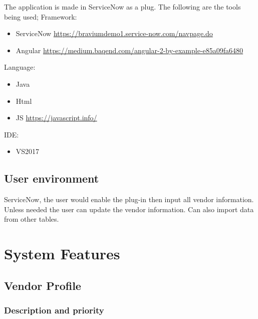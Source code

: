 \documentclass[10pt]{article}
\begin{document}
The application is made in ServiceNow as a plug. The following are the tools being used;
Framework:
\begin{itemize}
	\item ServiceNow \url{https://braviumdemo1.service-now.com/navpage.do}
	\item Angular \url{https://medium.baqend.com/angular-2-by-example-e85a09fa6480}
\end{itemize}
Language:
\begin{itemize}
	\item Java
	\item Html
	\item JS \url{https://javascript.info/}
\end{itemize}
IDE:
\begin{itemize}
	\item VS2017
\end{itemize}

\subsection{User environment}

ServiceNow, the user would enable the plug-in then input all vendor information. Unless needed the user can update the vendor information. Can also import data from other tables. 











\section{System Features}

\subsection{Vendor Profile}

\subsubsection{Description and priority}
\end{document}
